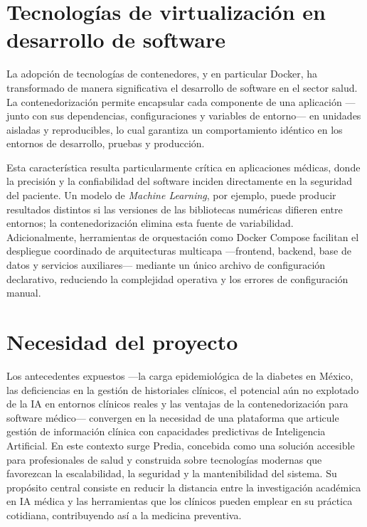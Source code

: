 \documentclass[12pt, letterpaper, twoside]{report}
\begin{document}
\section{Tecnologías de virtualización en desarrollo de software}

La adopción de tecnologías de contenedores, y en particular Docker, ha transformado de manera significativa el desarrollo de software en el sector salud. La contenedorización permite encapsular cada componente de una aplicación ---junto con sus dependencias, configuraciones y variables de entorno--- en unidades aisladas y reproducibles, lo cual garantiza un comportamiento idéntico en los entornos de desarrollo, pruebas y producción.

Esta característica resulta particularmente crítica en aplicaciones médicas, donde la precisión y la confiabilidad del software inciden directamente en la seguridad del paciente. Un modelo de \textit{Machine Learning}, por ejemplo, puede producir resultados distintos si las versiones de las bibliotecas numéricas difieren entre entornos; la contenedorización elimina esta fuente de variabilidad. Adicionalmente, herramientas de orquestación como Docker Compose facilitan el despliegue coordinado de arquitecturas multicapa ---frontend, backend, base de datos y servicios auxiliares--- mediante un único archivo de configuración declarativo, reduciendo la complejidad operativa y los errores de configuración manual.

\section{Necesidad del proyecto}

Los antecedentes expuestos ---la carga epidemiológica de la diabetes en México, las deficiencias en la gestión de historiales clínicos, el potencial aún no explotado de la IA en entornos clínicos reales y las ventajas de la contenedorización para software médico--- convergen en la necesidad de una plataforma que articule gestión de información clínica con capacidades predictivas de Inteligencia Artificial. En este contexto surge Predia, concebida como una solución accesible para profesionales de salud y construida sobre tecnologías modernas que favorezcan la escalabilidad, la seguridad y la mantenibilidad del sistema. Su propósito central consiste en reducir la distancia entre la investigación académica en IA médica y las herramientas que los clínicos pueden emplear en su práctica cotidiana, contribuyendo así a la medicina preventiva.
\end{document}

